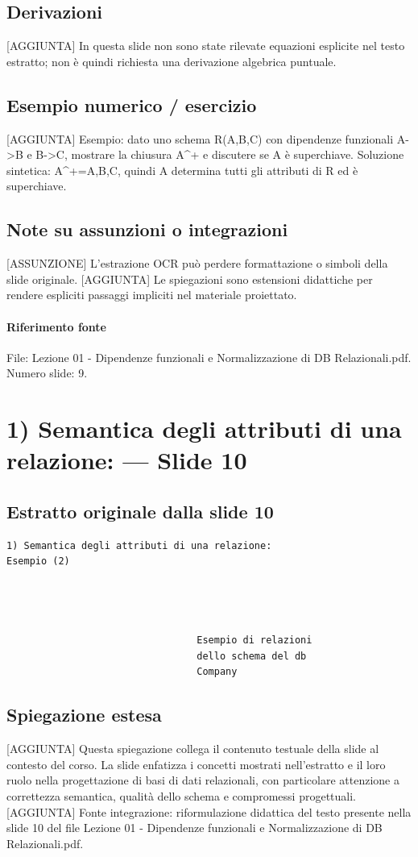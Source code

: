 \documentclass[11pt]{article}
\begin{document}
\subsection*{Derivazioni}
[AGGIUNTA] In questa slide non sono state rilevate equazioni esplicite nel testo estratto; non è quindi richiesta una derivazione algebrica puntuale.
\subsection*{Esempio numerico / esercizio}
[AGGIUNTA] Esempio: dato uno schema R(A,B,C) con dipendenze funzionali A->B e B->C, mostrare la chiusura A^+ e discutere se A è superchiave. Soluzione sintetica: A^+={A,B,C}, quindi A determina tutti gli attributi di R ed è superchiave.
\subsection*{Note su assunzioni o integrazioni}
[ASSUNZIONE] L'estrazione OCR può perdere formattazione o simboli della slide originale.
[AGGIUNTA] Le spiegazioni sono estensioni didattiche per rendere espliciti passaggi impliciti nel materiale proiettato.
\paragraph{Riferimento fonte} File: Lezione 01 - Dipendenze funzionali e Normalizzazione di DB Relazionali.pdf. Numero slide: 9.
\section{1) Semantica degli attributi di una relazione: --- Slide 10}
\subsection*{Estratto originale dalla slide 10}
\begin{lstlisting}
1) Semantica degli attributi di una relazione:
Esempio (2)




                                 Esempio di relazioni
                                 dello schema del db
                                 Company
\end{lstlisting}
\subsection*{Spiegazione estesa}
[AGGIUNTA] Questa spiegazione collega il contenuto testuale della slide al contesto del corso. La slide enfatizza i concetti mostrati nell'estratto e il loro ruolo nella progettazione di basi di dati relazionali, con particolare attenzione a correttezza semantica, qualità dello schema e compromessi progettuali.
[AGGIUNTA] Fonte integrazione: riformulazione didattica del testo presente nella slide 10 del file Lezione 01 - Dipendenze funzionali e Normalizzazione di DB Relazionali.pdf.
\end{document}
